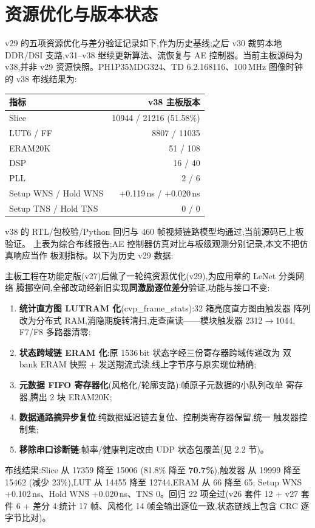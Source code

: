 \section{资源优化与版本状态}

v29 的五项资源优化与差分验证记录如下,作为历史基线;之后 v30 裁剪本地 DDR/DSI
支路,v31--v38 继续更新算法、流恢复与 AE 控制器。当前主板源码为 v38,并非 v29
资源快照。PH1P35MDG324、TD 6.2.168116、100\,MHz 图像时钟的 v38 布线结果为:

\begin{center}\small
\begin{tabular}{lr}
\toprule
指标 & v38 主板版本 \\
\midrule
Slice & 10944 / 21216 (51.58\%) \\
LUT6 / FF & 8807 / 11035 \\
ERAM20K & 51 / 108 \\
DSP & 16 / 40 \\
PLL & 2 / 6 \\
Setup WNS / Hold WNS & +0.119\,ns / +0.020\,ns \\
Setup TNS / Hold TNS & 0 / 0 \\
\bottomrule
\end{tabular}
\end{center}

v38 的 RTL/包校验/Python 回归与 460 帧视频链路模型均通过,当前源码已上板验证。
上表为综合布线报告;AE 控制器仿真对比与板级观测分别记录,本文不把仿真响应当作
板测指标。以下为历史 v29 数据:

主板工程在功能定版(v27)后做了一轮纯资源优化(v29),为应用章的 LeNet 分类网络
腾挪空间,全部改动经新旧实现\textbf{同激励逐位差分}验证,功能与接口不变:

\begin{enumerate}[nosep]
\item \textbf{统计直方图 LUTRAM 化}(cvp\_frame\_stats):32 箱亮度直方图由触发器
阵列改为分布式 RAM,消隐期旋转清扫,走查直读——模块触发器 2312$\to$1044,
F7/F8 多路器清零;
\item \textbf{状态跨域链 ERAM 化}:原 1536\,bit 状态字经三份寄存器跨域传递改为
双 bank ERAM 快照 + 发送期流式读,线上字节序与原实现位精确;
\item \textbf{元数据 FIFO 寄存器化}(风格化/轮廓支路):帧原子元数据的小队列改单
寄存器,腾出 2 块 ERAM20K;
\item \textbf{数据通路摘异步复位}:纯数据延迟链去复位、控制类寄存器保留,统一
触发器控制集;
\item \textbf{移除串口诊断链}:帧率/健康判定改由 UDP 状态包覆盖(见 2.2 节)。
\end{enumerate}

布线结果:Slice 从 17359 降至 15006 (81.8\% 降至 \textbf{70.7\%}),触发器
从 19999 降至 15462 (减少 23\%),LUT 从 14455 降至 12744,ERAM 从 66 降至 65;
Setup WNS +0.102\,ns、Hold WNS +0.020\,ns、TNS 0。回归 22 项全过(v26 套件 12 + v27 套件 6 +
差分 4:统计 17 帧、风格化 14 帧全输出逐位一致,状态链线上包含 CRC 逐字节比对)。
